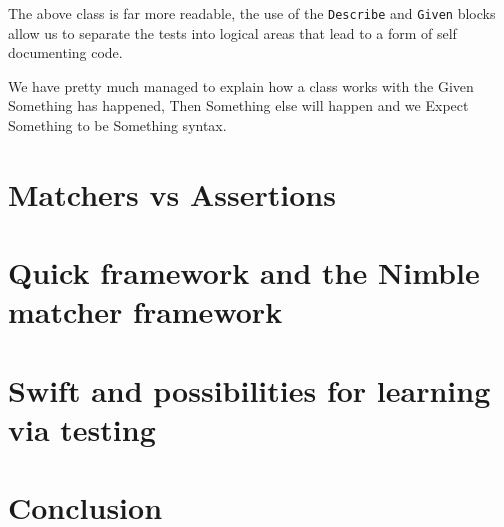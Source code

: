 \documentclass[a4paper, titlepage]{article}
\begin{document}
  The above class is far more readable, the use of the
  \texttt{Describe} and \texttt{Given} blocks allow us to separate the
  tests into logical areas that lead to a form of self
  documenting code.
  
  We have pretty much managed to explain how a class
  works with the Given Something has happened, Then Something else will
  happen and we Expect Something to be Something syntax.


\section{Matchers vs Assertions}
\section{Quick framework and the Nimble matcher framework}
\section{Swift and possibilities for learning via testing}
\section{Conclusion}
  
\end{document}
